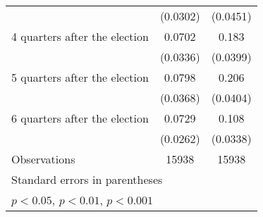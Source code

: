 \begin{table}[htbp]
\begin{tabular}{l*{2}{c}}
                    &    (0.0302)         &    (0.0451)         \\
[1em]
 4 quarters after the election&      0.0702\sym{*}  &       0.183\sym{***}\\
                    &    (0.0336)         &    (0.0399)         \\
[1em]
 5 quarters after the election&      0.0798\sym{*}  &       0.206\sym{***}\\
                    &    (0.0368)         &    (0.0404)         \\
[1em]
 6 quarters after the election&      0.0729\sym{**} &       0.108\sym{**} \\
                    &    (0.0262)         &    (0.0338)         \\
\hline
Observations        &       15938         &       15938         \\
\hline\hline
\multicolumn{3}{l}{\footnotesize Standard errors in parentheses}\\
\multicolumn{3}{l}{\footnotesize \sym{*} \(p<0.05\), \sym{**} \(p<0.01\), \sym{***} \(p<0.001\)}\\
\end{tabular}
\end{table}
